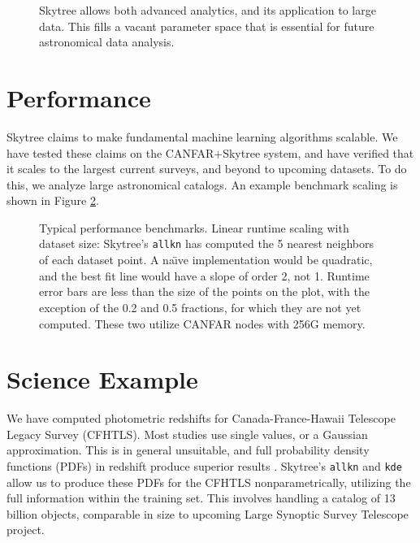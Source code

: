 \documentclass[11pt,twoside]{article}
\begin{document}
\begin{figure}
\caption{Skytree allows both advanced analytics, and its application to large data. This fills a vacant parameter space that is essential for future astronomical data analysis. \label{Fig: Skytree}}
\end{figure}

\section{Performance} \label{Sec: Performance}

Skytree claims to make fundamental machine learning algorithms scalable. We have tested these claims on the CANFAR+Skytree system, and have verified that it scales to the largest current surveys, and beyond to upcoming datasets. To do this, we analyze large astronomical catalogs. An example benchmark scaling is shown in Figure \ref{Fig: runtime}.

\begin{figure}
\caption{Typical performance benchmarks. Linear runtime scaling with dataset size: Skytree's {\tt allkn} has computed the 5 nearest neighbors of each dataset point. A na\"{\i}ve implementation would be quadratic, and the best fit line would have a slope of order 2, not 1. Runtime error bars are less than the size of the points on the plot, with the exception of the 0.2 and 0.5 fractions, for which they are not yet computed. These two utilize CANFAR nodes with 256G memory. \label{Fig: runtime}}
\end{figure}

\section{Science Example} \label{Sec: Science Example}

We have computed photometric redshifts for Canada-France-Hawaii Telescope Legacy Survey (CFHTLS). Most studies use single values, or a Gaussian approximation. This is in general unsuitable, and full probability density functions (PDFs) in redshift produce superior results \citep{ball:pdfphotoz}. Skytree's {\tt allkn} and {\tt kde} allow us to produce these PDFs for the CFHTLS nonparametrically, utilizing the full information within the training set. This involves handling a catalog of 13 billion objects, comparable in size to upcoming Large Synoptic Survey Telescope project.
\end{document}
